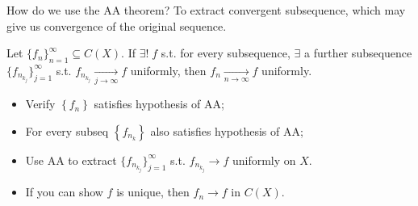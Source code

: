 \begin{rem}
    How do we use the AA theorem? To extract convergent subsequence, which may give us convergence
    of the original sequence. 
\end{rem} 

\begin{goal}[fact]
    Let $\{f_{n}\}_{n=1}^{\infty} \subseteq C(X)$. If $\exists! \; f$ 
    s.t. for every subsequence, $\exists $ a further subsequence $\{f_{n_{k_j}}\}_{j=1}^{\infty} $ s.t. 
    $f_{n_{k_j}} \xrightarrow[j \to \infty]{} f$ uniformly, then $f_n \xrightarrow[n \to \infty]{} f $ 
    uniformly.     
\end{goal}  

\begin{exmp}
    \begin{itemize}
    \item Verify $\left\{ f_n \right\} $  satisfies hypothesis of AA;
    \item For every subseq $\left\{ f_{n_k} \right\} $ also satisfies hypothesis of AA; 
    \item Use AA to extract $\{f_{n_{k_j}}\}_{j=1}^{\infty} $ s.t. $f_{n_{k_j}} \to f$ uniformly on $X$.
    \item If you can show $f$ is unique, then $f_n \to f$ in $C(X)$.     
\end{itemize}
\end{exmp}

